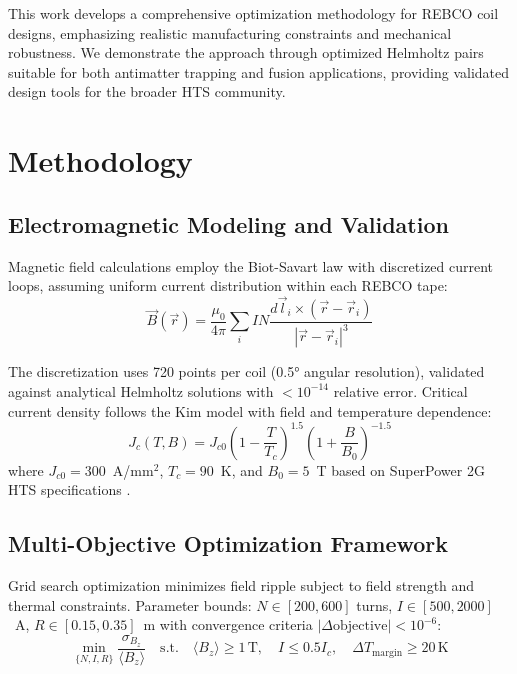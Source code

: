 \documentclass[10pt,twocolumn]{article}
\begin{document}
This work develops a comprehensive optimization methodology for REBCO coil designs, emphasizing realistic manufacturing constraints and mechanical robustness. We demonstrate the approach through optimized Helmholtz pairs suitable for both antimatter trapping and fusion applications, providing validated design tools for the broader HTS community.

\section{Methodology}

\subsection{Electromagnetic Modeling and Validation}

Magnetic field calculations employ the Biot-Savart law with discretized current loops, assuming uniform current distribution within each REBCO tape:
\begin{equation}
\vec{B}(\vec{r}) = \frac{\mu_0}{4\pi} \sum_{i} I N \frac{d\vec{l}_i \times (\vec{r} - \vec{r}_i)}{|\vec{r} - \vec{r}_i|^3}
\end{equation}

The discretization uses 720 points per coil (0.5° angular resolution), validated against analytical Helmholtz solutions with $<10^{-14}$ relative error. Critical current density follows the Kim model with field and temperature dependence:
\begin{equation}
J_c(T,B) = J_{c0} \left(1-\frac{T}{T_c}\right)^{1.5} \left(1+\frac{B}{B_0}\right)^{-1.5}
\end{equation}
where $J_{c0}=300$~A/mm$^2$, $T_c=90$~K, and $B_0=5$~T based on SuperPower 2G HTS specifications \cite{superpower2023}.

\subsection{Multi-Objective Optimization Framework}

Grid search optimization minimizes field ripple subject to field strength and thermal constraints. Parameter bounds: $N \in [200,600]$ turns, $I \in [500,2000]$~A, $R \in [0.15,0.35]$~m with convergence criteria $|\Delta \text{objective}| < 10^{-6}$:
\begin{equation}
\min_{\{N,I,R\}} \frac{\sigma_{B_z}}{\langle B_z \rangle} \quad \text{s.t.} \quad \langle B_z \rangle \geq 1\,\text{T}, \quad I \leq 0.5 I_c, \quad \Delta T_{\text{margin}} \geq 20\,\text{K}
\end{equation}
\end{document}
